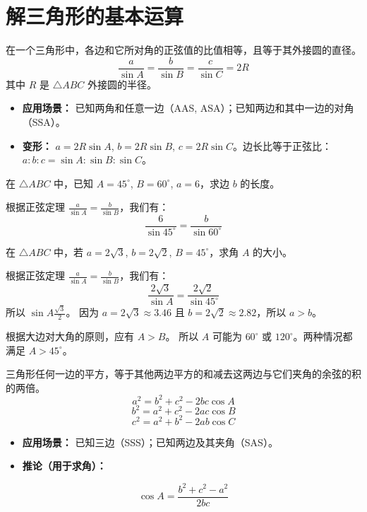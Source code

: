 \section{解三角形的基本运算}

\begin{theorem}[正弦定理]
    在一个三角形中，各边和它所对角的正弦值的比值相等，且等于其外接圆的直径。
    $$
        \frac{a}{\sin A} = \frac{b}{\sin B} = \frac{c}{\sin C} = 2R
    $$
    其中 $R$ 是 $\triangle ABC$ 外接圆的半径。
    \begin{itemize}
        \item \textbf{应用场景：} 已知两角和任意一边（AAS, ASA）；已知两边和其中一边的对角（SSA）。
        \item \textbf{变形：} $a = 2R \sin A$, $b = 2R \sin B$, $c = 2R \sin C$。边长比等于正弦比：$a:b:c = \sin A : \sin B : \sin C$。
    \end{itemize}
\end{theorem}

\begin{example}
    在 $\triangle ABC$ 中，已知 $A=45^\circ$, $B=60^\circ$, $a=6$，求边 $b$ 的长度。
\end{example}
\begin{solution}
    根据正弦定理 $\frac{a}{\sin A} = \frac{b}{\sin B}$，我们有：
    $$
        \frac{6}{\sin 45^\circ} = \frac{b}{\sin 60^\circ}
    $$
\end{solution}
\vspace{2em}


\begin{example}
    在 $\triangle ABC$ 中，若 $a=2\sqrt{3}$, $b=2\sqrt{2}$, $B=45^\circ$，求角 $A$ 的大小。
\end{example}
\begin{solution}
    根据正弦定理 $\frac{a}{\sin A} = \frac{b}{\sin B}$，我们有：
    $$
        \frac{2\sqrt{3}}{\sin A} = \frac{2\sqrt{2}}{\sin 45^\circ}
    $$
    所以 $\sin A  \frac{\sqrt{3}}{2}$。
    因为 $a=2\sqrt{3} \approx 3.46$ 且 $b=2\sqrt{2} \approx 2.82$，所以 $a > b$。

    根据大边对大角的原则，应有 $A > B$。
    所以 $A$ 可能为 $60^\circ$ 或 $120^\circ$。两种情况都满足 $A > 45^\circ$。
\end{solution}
\vspace{2em}

\begin{theorem}[余弦定理]
    三角形任何一边的平方，等于其他两边平方的和减去这两边与它们夹角的余弦的积的两倍。
    $$
        a^2 = b^2 + c^2 - 2bc \cos A
    $$
    $$
        b^2 = a^2 + c^2 - 2ac \cos B
    $$
    $$
        c^2 = a^2 + b^2 - 2ab \cos C
    $$
    \begin{itemize}
        \item \textbf{应用场景：} 已知三边（SSS）；已知两边及其夹角（SAS）。
        \item \textbf{推论（用于求角）：}
    \end{itemize}
    $$
        \cos A = \frac{b^2 + c^2 - a^2}{2bc}
    $$
\end{theorem}

